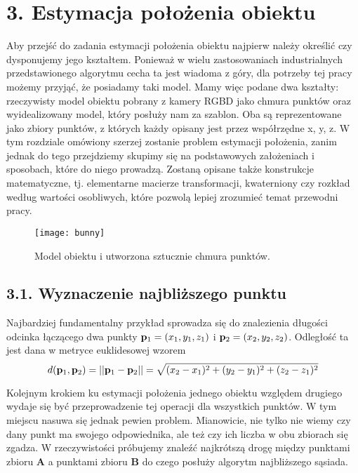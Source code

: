 \documentclass{article}
\begin{document}
\newpage
\section*{\LARGE{3. Estymacja położenia obiektu}} 

Aby przejść do zadania estymacji położenia obiektu najpierw należy określić czy dysponujemy jego kształtem. Ponieważ w wielu zastosowaniach industrialnych przedstawionego algorytmu cecha ta jest wiadoma z góry, dla potrzeby tej pracy możemy przyjąć, że posiadamy taki model. Mamy więc podane dwa kształty: rzeczywisty model obiektu pobrany z kamery RGBD jako chmura punktów oraz wyidealizowany model, który posłuży nam za szablon. Oba są reprezentowane jako zbiory punktów, z których każdy opisany jest przez współrzędne x, y, z. W tym rozdziale omówiony szerzej zostanie problem estymacji położenia, zanim jednak do tego przejdziemy skupimy się na podstawowych założeniach i sposobach, które do niego prowadzą. Zostaną opisane także konstrukcje matematyczne, tj. elementarne macierze transformacji, kwaterniony czy rozkład według wartości osobliwych, które pozwolą lepiej zrozumieć temat przewodni pracy.

\begin{figure}[h]
\centering
\texttt{[image: bunny]}
\caption{Model obiektu i utworzona sztucznie chmura punktów.}
\end{figure}

\subsection*{\LARGE{3.1. Wyznaczenie najbliższego punktu}} 

Najbardziej fundamentalny przykład sprowadza się do znalezienia długości odcinka łączącego dwa punkty $\vb{p}_{1} = (x_{1}, y_{1}, z_{1})$ i $\vb{p}_{2} = (x_{2}, y_{2}, z_{2})$. Odległość ta jest dana w metryce euklidesowej wzorem
\[d(\vb{p}_{1}, \vb{p}_{2}) = ||\vb{p}_{1} - \vb{p}_{2}|| = \sqrt{(x_{2}-x_{1})^2+(y_{2}-y_{1})^2+(z_{2}-z_{1})^2}\]

Kolejnym krokiem ku estymacji położenia jednego obiektu względem drugiego wydaje się być przeprowadzenie tej operacji dla wszystkich punktów. W tym miejscu nasuwa się jednak pewien problem. Mianowicie, nie tylko nie wiemy czy dany punkt ma swojego odpowiednika, ale też czy ich liczba w obu zbiorach się zgadza. W rzeczywistości próbujemy znaleźć najkrótszą drogę między punktami zbioru $\mathbf{A}$ a punktami zbioru $\mathbf{B}$ do czego posłuży algorytm najbliższego sąsiada.
\end{document}

